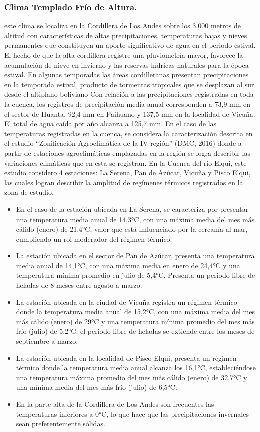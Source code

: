 \documentclass[10pt,]{article}
\begin{document}
		\subsubsection{Clima Templado Frío de Altura.}
este clima se localiza en la Cordillera de Los Andes sobre los 3.000 metros de altitud con características de altas precipitaciones, temperaturas bajas y nieves permanentes que constituyen un aporte significativo de agua en el periodo estival. El hecho de que la alta cordillera registre una pluviometría mayor, favorece la acumulación de nieve en invierno y las reservas hídricas naturales para la época estival. En algunas temporadas las áreas cordilleranas presentan precipitaciones en la temporada estival, producto de tormentas tropicales que se desplazan al sur desde el altiplano boliviano
Con relación a las precipitaciones registradas en toda la cuenca, los registros de precipitación media anual corresponden a 73,9 mm en el sector de Huanta, 92,4 mm en Paihuano y 137,5 mm en la localidad de Vicuña. El total de agua caída por año alcanza a 125,7 mm. 
En el caso de las temperaturas registradas en la cuenca, se considera la caracterización descrita  en el estudio “Zonificación Agroclimática de la IV región” (DMC, 2016) donde a partir de estaciones agroclimáticas emplazadas en la región se logra describir las variaciones climáticas que en esta se registran. En la Cuenca del río Elqui, este estudio considero 4 estaciones: La Serena, Pan de Azúcar, Vicuña y Pisco Elqui, las cuales logran describir la amplitud de regímenes térmicos registrados en la zona de estudio. 

\begin{itemize}
\item En el caso de la estación ubicada en La Serena, se caracteriza por presentar una temperatura media anual de 14,3°C, con una máxima media del mes más cálido (enero) de 21,4°C, valor que está influenciado por la cercanía al mar, cumpliendo un rol moderador del régimen térmico. 
\item La estación ubicada en el sector de Pan de Azúcar, presenta una temperatura media anual de 14,1°C, con una máxima media en enero de 24,4°C y una temperatura mínima promedio en julio de 5,4°C. Presenta un periodo libre de heladas de 8 meses entre agosto a marzo. 
\item La estación ubicada en la ciudad de Vicuña registra un régimen térmico donde la temperatura media anual de 15,2°C, con una máxima media del mes más cálido (enero) de 29°C y una temperatura mínima promedio del mes más frío (julio) de 5,2°C. el periodo libre de heladas se extiende entre los meses de septiembre a marzo.
\item La estación ubicada en la localidad de Pisco Elqui, presenta un régimen térmico donde la temperatura media anual alcanza los 16,1°C, estableciéndose una temperatura máxima promedio del mes más cálido (enero) de 32,7°C y una mínima media del mes más frío (julio) de 6,5°C.
\item En la parte alta de la Cordillera de Los Andes son frecuentes las temperaturas inferiores a 0°C, lo que hace que las precipitaciones invernales sean preferentemente sólidas.
\end{itemize}
\end{document}
